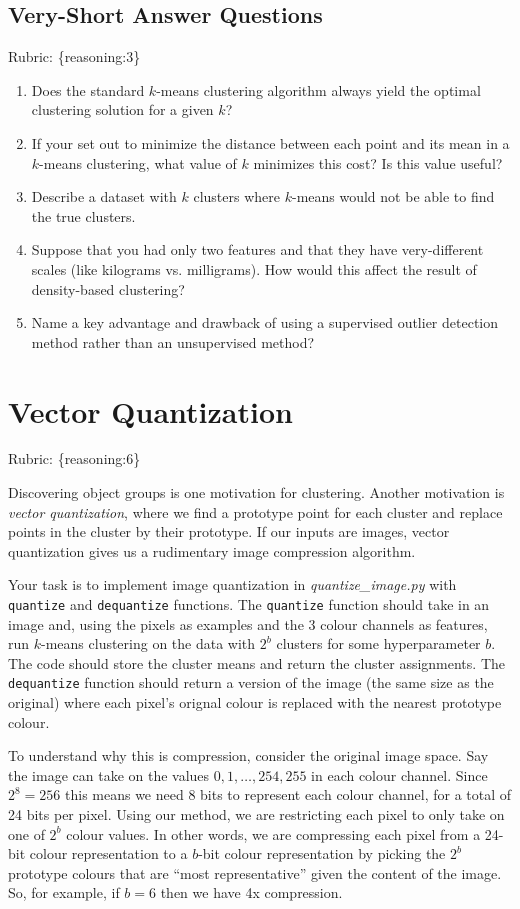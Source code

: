 \documentclass{article}
\def\blu#1{{\color{blu}#1}}
\def\gre#1{{\color{gre}#1}}
\def\enum#1{\begin{enumerate}#1\end{enumerate}}
\def\rubric#1{\gre{Rubric: \{#1\}}}{}
\begin{document}
\subsection{Very-Short Answer Questions}
\rubric{reasoning:3}

\blu{
\enum{
\item Does the standard $k$-means clustering algorithm always yield the optimal clustering solution for a given $k$?
\item If your set out to minimize the distance between each point and its mean in a $k$-means clustering, what value of $k$ minimizes this cost? Is this value useful?
\item Describe a dataset with $k$ clusters where $k$-means would not be able to find the true clusters.
\item Suppose that you had only two features and that they have very-different scales (like kilograms vs. milligrams). How would this affect the result of density-based clustering?
\item Name a key advantage and drawback of using a supervised outlier detection method rather than an unsupervised method?
}}



\section{Vector Quantization}
\rubric{reasoning:6}

Discovering object groups is one motivation for clustering. Another motivation is \emph{vector quantization}, where we find a prototype point for each cluster and replace points in the cluster by their prototype. If our inputs are images, vector quantization gives us a rudimentary image compression algorithm.

Your task is to implement image quantization in \emph{quantize\_image.py} with \texttt{quantize} and \texttt{dequantize} functions. The \texttt{quantize} function should take in an image and, using the pixels as examples and the 3 colour channels as features, run $k$-means clustering on the data with $2^b$ clusters for some hyperparameter $b$. The code should store the cluster means and return the cluster assignments. The \texttt{dequantize} function should return a version of the image (the same size as the original) where each pixel's orignal colour is replaced with the nearest prototype colour.

To understand why this is compression, consider the original image space. Say the image can take on the values $0,1,\ldots,254,255$ in each colour channel. Since $2^8=256$ this means we need 8 bits to represent each colour channel, for a total of 24 bits per pixel. Using our method, we are restricting each pixel to only take on one of $2^b$ colour values. In other words, we are compressing each pixel from a 24-bit colour representation to a $b$-bit colour representation by picking the $2^b$ prototype colours that are ``most representative'' given the content of the image. So, for example, if $b=6$ then we have 4x compression.
\end{document}
